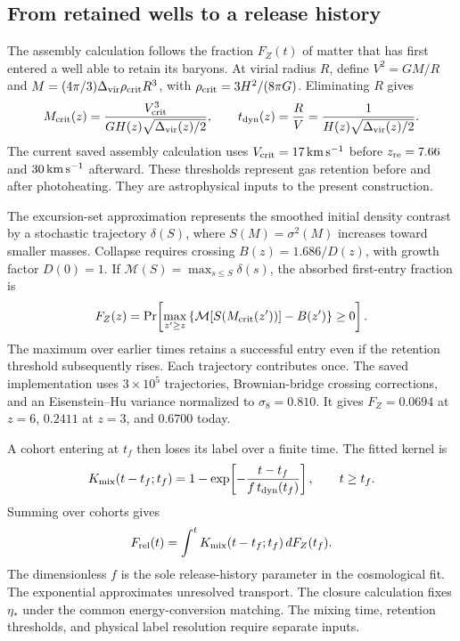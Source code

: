 \subsection{From retained wells to a release history}

The assembly calculation follows the fraction $F_Z(t)$ of matter that
has first entered a well able to retain its baryons. At virial radius
$R$, define $V^2=GM/R$ and
$M=(4\pi/3)\Delta_{\rm vir}\rho_{\rm crit}R^3$, with
$\rho_{\rm crit}=3H^2/(8\pi G)$. Eliminating $R$ gives
\begin{equation}
M_{\rm crit}(z)=\frac{V_{\rm crit}^3}
{G H(z)\sqrt{\Delta_{\rm vir}(z)/2}},\qquad
t_{\rm dyn}(z)=\frac{R}{V}
=\frac{1}{H(z)\sqrt{\Delta_{\rm vir}(z)/2}}.
\label{eq:retention}
\end{equation}
The current saved assembly calculation uses $V_{\rm crit}=17\,\mathrm{km\,s^{-1}}$ before
$z_{\rm re}=7.66$ and $30\,\mathrm{km\,s^{-1}}$ afterward. These thresholds represent
gas retention before and after photoheating. They are astrophysical
inputs to the present construction.

The excursion-set approximation represents the smoothed initial density
contrast by a stochastic trajectory $\delta(S)$, where
$S(M)=\sigma^2(M)$ increases toward smaller masses. Collapse requires
crossing $B(z)=1.686/D(z)$, with growth factor $D(0)=1$. If
$\mathcal M(S)=\max_{s\le S}\delta(s)$, the absorbed first-entry fraction is
\begin{equation}
F_Z(z)=\Pr\!\left[
\max_{z'\ge z}\left\{\mathcal M[S(M_{\rm crit}(z'))]-B(z')\right\}\ge0
\right].
\label{eq:firstentry}
\end{equation}
The maximum over earlier times retains a successful entry even if the
retention threshold subsequently rises. Each trajectory contributes once.
The saved implementation uses $3\times10^5$ trajectories, Brownian-bridge
crossing corrections, and an Eisenstein--Hu variance normalized to
$\sigma_8=0.810$. It gives $F_Z=0.0694$ at $z=6$, $0.2411$ at $z=3$,
and $0.6700$ today. 

A cohort entering at $t_f$ then loses its label over a finite time.
The fitted kernel is
\begin{equation}
K_{\rm mix}(t-t_f;t_f)=1-
\exp\!\left[-\frac{t-t_f}{f\,t_{\rm dyn}(t_f)}\right],\qquad t\ge t_f.
\end{equation}
Summing over cohorts gives
\begin{equation}
F_{\rm rel}(t)=\int^{t}K_{\rm mix}(t-t_f;t_f)\,dF_Z(t_f).
\label{eq:Frel}
\end{equation}
The dimensionless $f$ is the sole release-history parameter in the
cosmological fit. The exponential approximates unresolved transport.
The closure calculation fixes $\eta_*$ under the common energy-conversion
matching. The mixing time, retention thresholds, and physical label
resolution require separate inputs.

